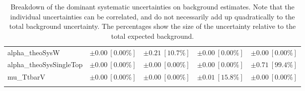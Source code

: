 \begin{sidewaystable}
\begin{center}
\begin{tabular*}{\textwidth}{@{\extracolsep{\fill}}lcccc}
alpha\_theoSysW         & $\pm 0.00\ [0.00\%] $          & $\pm 0.21\ [10.7\%] $          & $\pm 0.00\ [0.00\%] $          & $\pm 0.00\ [0.00\%] $       \\
alpha\_theoSysSingleTop         & $\pm 0.00\ [0.00\%] $          & $\pm 0.00\ [0.00\%] $          & $\pm 0.00\ [0.00\%] $          & $\pm 0.71\ [99.4\%] $       \\
mu\_TtbarV         & $\pm 0.00\ [0.00\%] $          & $\pm 0.00\ [0.00\%] $          & $\pm 0.01\ [15.8\%] $          & $\pm 0.00\ [0.00\%] $       \\
\noalign{\smallskip}\hline\noalign{\smallskip}
\end{tabular*}
\end{center}
\caption[Breakdown of uncertainty on background estimates]{
Breakdown of the dominant systematic uncertainties on background estimates.
Note that the individual uncertainties can be correlated, and do not necessarily add up quadratically to 
the total background uncertainty. The percentages show the size of the uncertainty relative to the total expected background.
\label{table.results.bkgestimate.uncertainties.SRC4_bybkg}}
\end{sidewaystable}
%